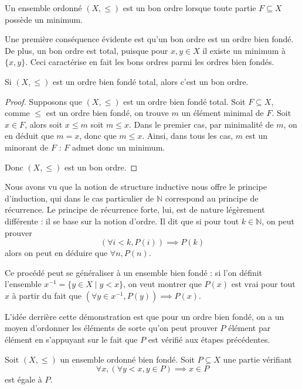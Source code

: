 \begin{definition}
  Un ensemble ordonné $(X,\leq)$ est un bon ordre lorsque toute partie
  $F\subseteq X$ possède un minimum.
\end{definition}

Une première conséquence évidente est qu'un bon ordre est un ordre bien fondé.
De plus, un bon ordre est total, puisque pour $x,y\in X$ il existe un minimum
à $\{x,y\}$. Ceci caractérise en fait les bons ordres parmi les ordres bien
fondés.

\begin{proposition}
  Si $(X,\leq)$ est un ordre bien fondé total, alors c'est un bon ordre.
\end{proposition}

\begin{proof}
  Supposons que $(X,\leq)$ est un ordre bien fondé total. Soit $F\subseteq X$,
  comme $\leq$ est un ordre bien fondé, on trouve $m$ un élément minimal de $F$.
  Soit $x\in F$, alors soit $x \leq m$ soit $m\leq x$. Dans le premier cas,
  par minimalité de $m$, on en déduit que $m = x$, donc que $m\leq x$. Ainsi,
  dans tous les cas, $m$ est un minorant de $F$ : $F$ admet donc un minimum.

  Donc $(X,\leq)$ est un bon ordre.
\end{proof}

Nous avons vu que la notion de structure inductive nous offre le principe
d'induction, qui dans le cas particulier de $\mathbb N$ correspond au principe de
récurrence. Le principe de récurrence forte, lui, est de nature légèrement
différente : il se base sur la notion d'ordre. Il dit que si pour tout
$k\in\mathbb N$, on peut prouver
\[(\forall i < k, P(i)) \implies P(k)\]
alors on peut en déduire que $\forall n, P(n)$.

Ce procédé peut se généraliser à un ensemble bien fondé : si l'on définit
l'ensemble
$x^{-1} = \{y \in X \mid y < x\}$, on veut montrer que $P(x)$ est vrai pour tout
$x$ à partir du fait que $(\forall y \in x^{-1}, P(y)) \implies P(x)$.

L'idée derrière cette démonstration est que pour un ordre bien fondé, on a un
moyen d'ordonner les éléments de sorte qu'on peut prouver $P$ élément par
élément en s'appuyant sur le fait que $P$ est vérifié aux étapes précédentes.

\begin{theorem}
  Soit $(X,\leq)$ un ensemble ordonné bien fondé. Soit $P\subseteq X$ une partie
  vérifiant
  \[\forall x, (\forall y < x, y\in P) \implies x\in P\]
  est égale à $P$.
\end{theorem}


